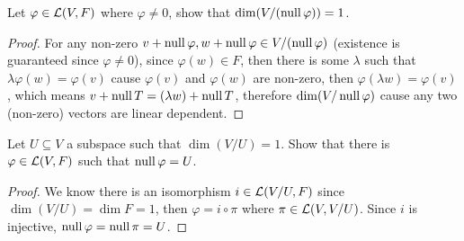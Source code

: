 \documentclass[../main.tex]{subfiles}
\begin{document}
\setcounter{exercise}{15}
\begin{exercise}
  Let $\varphi \in \mathcal{L}(V, F)$ where $\varphi \neq 0$, show that $\dim (V / (\operatorname{null} \varphi)) = 1$.
\end{exercise}
\begin{proof}
  For any non-zero $v + \operatorname{null} \varphi, w + \operatorname{null} \varphi \in V / (\operatorname{null} \varphi)$
  (existence is guaranteed since $\varphi \neq 0$),
  since $\varphi(w) \in F$, then there is some $\lambda$ such that $\lambda \varphi(w) = \varphi(v)$
  cause $\varphi(v)$ and $\varphi(w)$ are non-zero, then $\varphi(\lambda w) = \varphi(v)$,
  which means $v + \operatorname{null} T = (\lambda w) + \operatorname{null} T$, therefore $\dim (V / \operatorname{null} \varphi)$
  cause any two (non-zero) vectors are linear dependent.
\end{proof}

\begin{exercise}
  Let $U \subseteq V$ a subspace such that $\dim (V / U) = 1$. Show that
  there is $\varphi \in \mathcal{L}(V, F)$ such that $\operatorname{null} \varphi = U$.
\end{exercise}
\begin{proof}
  We know there is an isomorphism $i \in \mathcal{L}(V / U, F)$ since $\dim (V / U) = \dim F = 1$,
  then $\varphi = i \circ \pi$ where $\pi \in \mathcal{L}(V, V / U)$. Since $i$ is injective,
  $\operatorname{null} \varphi = \operatorname{null} \pi = U$.
\end{proof}
\end{document}
